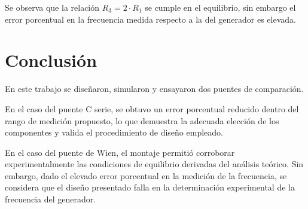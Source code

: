 \documentclass{article}
\begin{document}
Se observa que la relación $R_3 = 2\cdot R_1$ se cumple en el equilibrio, sin embargo el error porcentual en la frecuencia medida respecto a la del generador es elevada.

\section{Conclusión}
En este trabajo se diseñaron, simularon y ensayaron dos puentes de comparación.

En el caso del puente C serie, se obtuvo un error porcentual reducido dentro del rango de medición propuesto, lo que demuestra la adecuada elección de los componentes y valida el procedimiento de diseño empleado.

En el caso del puente de Wien, el montaje permitió corroborar experimentalmente las condiciones de equilibrio derivadas del análisis teórico. Sin embargo, dado el elevado error porcentual en la medición de la frecuencia, se considera que el diseño presentado falla en la determinación experimental de la frecuencia del generador.
\end{document}
